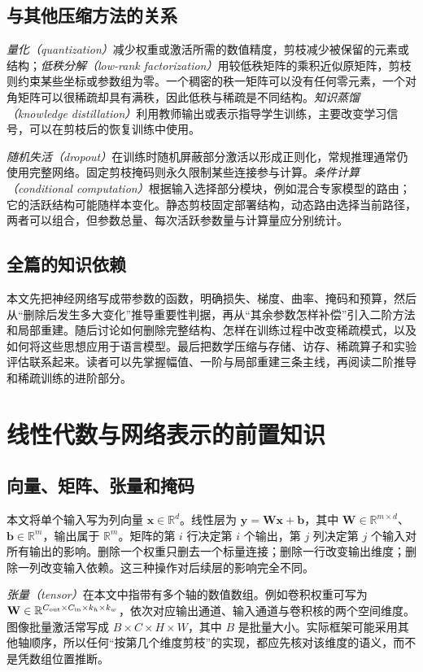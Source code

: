\documentclass[UTF8,12pt,a4paper,fontset=fandol]{ctexart}
\begin{document}
\subsection{与其他压缩方法的关系}
\emph{量化（quantization）}减少权重或激活所需的数值精度，剪枝减少被保留的元素或结构；\emph{低秩分解（low-rank factorization）}用较低秩矩阵的乘积近似原矩阵，剪枝则约束某些坐标或参数组为零。一个稠密的秩一矩阵可以没有任何零元素，一个对角矩阵可以很稀疏却具有满秩，因此低秩与稀疏是不同结构。\emph{知识蒸馏（knowledge distillation）}利用教师输出或表示指导学生训练，主要改变学习信号，可以在剪枝后的恢复训练中使用。

\emph{随机失活（dropout）}在训练时随机屏蔽部分激活以形成正则化，常规推理通常仍使用完整网络。固定剪枝掩码则永久限制某些连接参与计算。\emph{条件计算（conditional computation）}根据输入选择部分模块，例如混合专家模型的路由；它的活跃结构可能随样本变化。静态剪枝固定部署结构，动态路由选择当前路径，两者可以组合，但参数总量、每次活跃参数量与计算量应分别统计。

\subsection{全篇的知识依赖}
本文先把神经网络写成带参数的函数，明确损失、梯度、曲率、掩码和预算，然后从“删除后发生多大变化”推导重要性判据，再从“其余参数怎样补偿”引入二阶方法和局部重建。随后讨论如何删除完整结构、怎样在训练过程中改变稀疏模式，以及如何将这些思想应用于语言模型。最后把数学压缩与存储、访存、稀疏算子和实验评估联系起来。读者可以先掌握幅值、一阶与局部重建三条主线，再阅读二阶推导和稀疏训练的进阶部分。

\section{线性代数与网络表示的前置知识}
\label{sec:prune-linear}

\subsection{向量、矩阵、张量和掩码}
本文将单个输入写为列向量 $\mathbf x\in\mathbb R^d$。线性层为 $\mathbf y=\mathbf W\mathbf x+\mathbf b$，其中 $\mathbf W\in\mathbb R^{m\times d}$、$\mathbf b\in\mathbb R^m$，输出属于 $\mathbb R^m$。矩阵的第 $i$ 行决定第 $i$ 个输出，第 $j$ 列决定第 $j$ 个输入对所有输出的影响。删除一个权重只删去一个标量连接；删除一行改变输出维度；删除一列改变输入依赖。这三种操作对后续层的影响完全不同。

\emph{张量（tensor）}在本文中指带有多个轴的数值数组。例如卷积权重可写为 $\mathbf W\in\mathbb R^{C_{\rm out}\times C_{\rm in}\times k_h\times k_w}$，依次对应输出通道、输入通道与卷积核的两个空间维度。图像批量激活常写成 $B\times C\times H\times W$，其中 $B$ 是批量大小。实际框架可能采用其他轴顺序，所以任何“按第几个维度剪枝”的实现，都应先核对该维度的语义，而不是凭数组位置推断。
\end{document}

